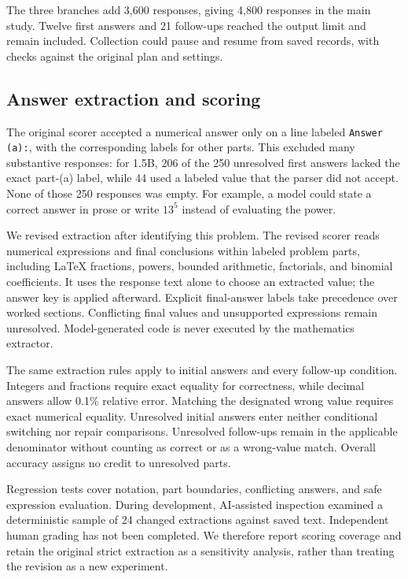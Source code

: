 \documentclass[11pt]{article}
\begin{document}
The three branches add 3,600 responses, giving 4,800 responses in the main study. Twelve first answers and 21 follow-ups reached the output limit and remain included. Collection could pause and resume from saved records, with checks against the original plan and settings.

\subsection{Answer extraction and scoring}
The original scorer accepted a numerical answer only on a line labeled \texttt{Answer (a):}, with the corresponding labels for other parts. This excluded many substantive responses: for 1.5B, 206 of the 250 unresolved first answers lacked the exact part-(a) label, while 44 used a labeled value that the parser did not accept. None of those 250 responses was empty. For example, a model could state a correct answer in prose or write $13^5$ instead of evaluating the power.

We revised extraction after identifying this problem. The revised scorer reads numerical expressions and final conclusions within labeled problem parts, including LaTeX fractions, powers, bounded arithmetic, factorials, and binomial coefficients. It uses the response text alone to choose an extracted value; the answer key is applied afterward. Explicit final-answer labels take precedence over worked sections. Conflicting final values and unsupported expressions remain unresolved. Model-generated code is never executed by the mathematics extractor.

The same extraction rules apply to initial answers and every follow-up condition. Integers and fractions require exact equality for correctness, while decimal answers allow 0.1\% relative error. Matching the designated wrong value requires exact numerical equality. Unresolved initial answers enter neither conditional switching nor repair comparisons. Unresolved follow-ups remain in the applicable denominator without counting as correct or as a wrong-value match. Overall accuracy assigns no credit to unresolved parts.

Regression tests cover notation, part boundaries, conflicting answers, and safe expression evaluation. During development, AI-assisted inspection examined a deterministic sample of 24 changed extractions against saved text. Independent human grading has not been completed. We therefore report scoring coverage and retain the original strict extraction as a sensitivity analysis, rather than treating the revision as a new experiment.
\end{document}
